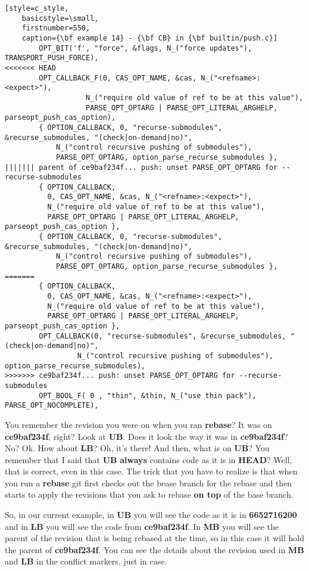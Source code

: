 \begin{lstlisting}[style=c_style,
	basicstyle=\small,
	firstnumber=550,
	caption={\bf example 14} - {\bf CB} in {\bf builtin/push.c}]
		OPT_BIT('f', "force", &flags, N_("force updates"), TRANSPORT_PUSH_FORCE),
<<<<<<< HEAD
		OPT_CALLBACK_F(0, CAS_OPT_NAME, &cas, N_("<refname>:<expect>"),
			       N_("require old value of ref to be at this value"),
			       PARSE_OPT_OPTARG | PARSE_OPT_LITERAL_ARGHELP, parseopt_push_cas_option),
		{ OPTION_CALLBACK, 0, "recurse-submodules", &recurse_submodules, "(check|on-demand|no)",
			N_("control recursive pushing of submodules"),
			PARSE_OPT_OPTARG, option_parse_recurse_submodules },
||||||| parent of ce9baf234f... push: unset PARSE_OPT_OPTARG for --recurse-submodules
		{ OPTION_CALLBACK,
		  0, CAS_OPT_NAME, &cas, N_("<refname>:<expect>"),
		  N_("require old value of ref to be at this value"),
		  PARSE_OPT_OPTARG | PARSE_OPT_LITERAL_ARGHELP, parseopt_push_cas_option },
		{ OPTION_CALLBACK, 0, "recurse-submodules", &recurse_submodules, "(check|on-demand|no)",
			N_("control recursive pushing of submodules"),
			PARSE_OPT_OPTARG, option_parse_recurse_submodules },
=======
		{ OPTION_CALLBACK,
		  0, CAS_OPT_NAME, &cas, N_("<refname>:<expect>"),
		  N_("require old value of ref to be at this value"),
		  PARSE_OPT_OPTARG | PARSE_OPT_LITERAL_ARGHELP, parseopt_push_cas_option },
		OPT_CALLBACK(0, "recurse-submodules", &recurse_submodules, "(check|on-demand|no)",
			     N_("control recursive pushing of submodules"), option_parse_recurse_submodules),
>>>>>>> ce9baf234f... push: unset PARSE_OPT_OPTARG for --recurse-submodules
		OPT_BOOL_F( 0 , "thin", &thin, N_("use thin pack"), PARSE_OPT_NOCOMPLETE),
\end{lstlisting}

You remember the revision you were on when you ran {\bf rebase}? It was on {\bf ce9baf234f}, right? Look at {\bf UB}. Does
it look the way it was in {\bf ce9baf234f}? No? Ok. How about {\bf LB}? Oh, it's there! And then, what is on {\bf UB}? You
remember that I said that {\bf UB} {\bf always} contains code as it is in {\bf HEAD}? Well, that is correct, even in this case.
The trick that you have to realize is that when you run a {\bf rebase} git first checks out the bease branch for the rebase and
then starts to apply the revisions that you ask to rebase {\bf on top} of the base branch.

So, in our current example, in {\bf UB} you will see the code as it is in {\bf 6652716200} and in {\bf LB} you will see the
code from {\bf ce9baf234f}. In {\bf MB} you will see the parent of the revision that is being rebased at the time, so in this
case it will hold the parent of {\bf ce9baf234f}. You can see the details about the revision used in {\bf MB} and {\bf LB}
in the conflict markers, just in case.

